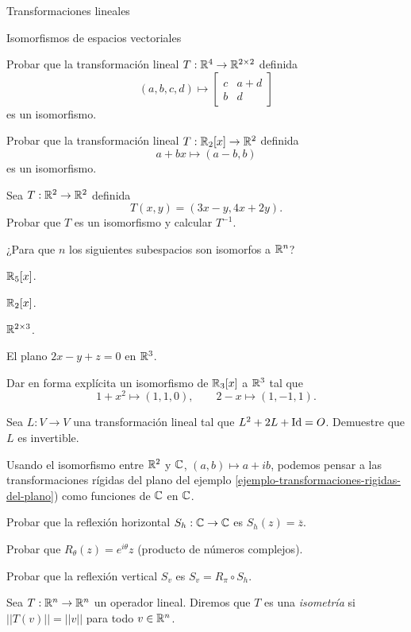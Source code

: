 \begin{chapter}{Transformaciones lineales}
\begin{section}{Isomorfismos de espacios vectoriales}
    \begin{enumex}
        \item Probar que la transformación lineal $T: \mathbb R^4 \to \mathbb R^{2 \times 2}$  definida
        $$
        (a,b,c,d) \mapsto \begin{bmatrix}
            c&a+d\\ b&d
        \end{bmatrix}
        $$
        es un isomorfismo. 
        \item Probar que la transformación lineal $T: \mathbb R_2[x] \to \mathbb R^{2}$  definida
        $$
        a+bx \mapsto (a-b,b)
        $$
        es un isomorfismo. 
        \item Sea $T: \mathbb R^2 \to \mathbb R^{2}$ definida
        $$
        T(x, y) = (3x - y, 4x + 2y).
        $$
        Probar que $T$ es un isomorfismo y calcular $T^{-1}$.
        \item ¿Para que $n$ los siguientes subespacios son isomorfos a $\mathbb R^n$?
        \begin{enumex}
            \item $\mathbb R_5[x]$.
            \item $\mathbb R_2[x]$.
            \item $\mathbb R^{2 \times 3}$.
            \item El plano $2x-y+z=0$ en $\mathbb R^3$.
        \end{enumex}
        \item Dar en forma explícita un isomorfismo de $\mathbb R_3[x]$ a $\mathbb R^3$ tal que
        $$
        1 +x^2 \mapsto (1,1,0), \qquad 2-x \mapsto (1, -1, 1).
        $$
        \item Sea $L: V \to V$ una transformación lineal tal que $L^2 + 2L + \operatorname{Id} = O$. Demuestre que $L$ es invertible.
        \item Usando el isomorfismo entre $\mathbb R^2$ y $\mathbb C$, $(a,b)\mapsto a + ib$,  podemos pensar a las transformaciones rígidas del plano del ejemplo \ref{ejemplo-transformaciones-rigidas-del-plano}) como funciones de $\mathbb C$ en $\mathbb C$.
            \begin{enumex}
                \item  Probar que la reflexión horizontal  $S_h: \mathbb C \to \mathbb C$ es $S_h(z) = \overline{z}$. 
                \item Probar que $R_\theta(z) = e^{i\theta}z$ (producto de números complejos). 
                \item Probar que la reflexión vertical $S_v$  es $S_v = R_\pi \circ S_h$. 
            \end{enumex}
        \item\label{ejercicio-isometria} Sea $T: \mathbb R^n \to \mathbb R^n$ un operador lineal. Diremos que $T$  es una  \textit{isometría} si $||T(v)|| = ||v||$ para todo $v \in \mathbb R^n$. 

\end{enumex}
\end{section}
\end{chapter}
